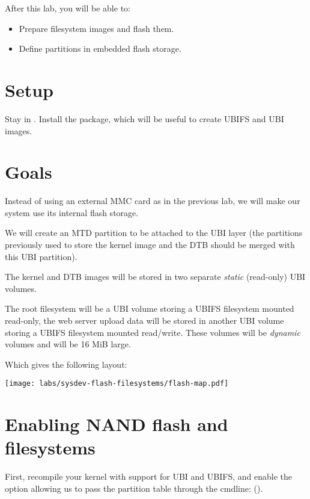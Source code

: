 
After this lab, you will be able to:
\begin{itemize}
\item Prepare filesystem images and flash them.
\item Define partitions in embedded flash storage.
\end{itemize}

\section{Setup}

Stay in . Install the
 package, which will be useful to create UBIFS and
UBI images.

\section{Goals}

Instead of using an external MMC card as in the previous lab, we will
make our system use its internal flash storage.

We will create an MTD partition to be attached to the UBI layer (the partitions
previously used to store the kernel image and the DTB should be merged
with this UBI partition).

The kernel and DTB images will be stored in two separate {\em static}
(read-only) UBI volumes.

The root filesystem will be a UBI volume storing a UBIFS filesystem
mounted read-only, the web server upload data will be stored in
another UBI volume storing a UBIFS filesystem mounted
read/write. These volumes will be {\em dynamic} volumes and will be
16 MiB large.

Which gives the following layout:

\begin{center}
  \texttt{[image: labs/sysdev-flash-filesystems/flash-map.pdf]}
\end{center}

\section{Enabling NAND flash and filesystems}

First, recompile your kernel with support for UBI and UBIFS, and enable
the option allowing us to pass the partition table through the cmdline:
().

